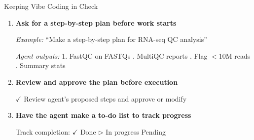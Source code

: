 \documentclass[aspectratio=169]{beamer}
\begin{document}
\begin{frame}{Keeping Vibe Coding in Check}
  \begin{enumerate}
    \item \textbf{Ask for a step-by-step plan before work starts}

    \vspace{0.1cm}
    \small
    \textit{Example:} ``Make a step-by-step plan for RNA-seq QC analysis''

    \vspace{0.1cm}
    \footnotesize
    \textit{Agent outputs:}
    1. FastQC on FASTQs . MultiQC reports . Flag $<$10M reads . Summary stats

    \vspace{0.2cm}

    \item \textbf{Review and approve the plan before execution}

    \vspace{0.1cm}
    \small
    \textcolor{conesaTeal}{$\checkmark$} Review agent's proposed steps and approve or modify

    \vspace{0.2cm}

    \item \textbf{Have the agent make a to-do list to track progress}

    \vspace{0.1cm}
    \small
    Track completion: \textcolor{conesaTeal}{$\checkmark$} Done \;\;
    \textcolor{conesaOrange}{$\triangleright$} In progress \;\;
    Pending
  \end{enumerate}
\end{frame}
\end{document}
